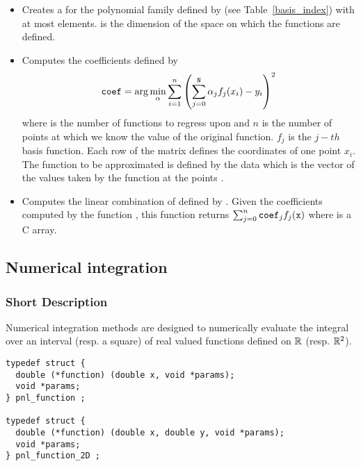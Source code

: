 \begin{itemize}
\item {}
  \sshortdescribe Creates a  for the polynomial family
  defined by  (see Table~\ref{basis_index}) with at most 
  elements.  is the dimension of the space on which the functions are
  defined.

\item {}
  \sshortdescribe Computes the coefficients  defined by
  \begin{equation*}
    {\tt coef} = \arg\min_\alpha \sum_{i=1}^n
    \left( \sum_{j=0}^{{\tt N}} \alpha_j  f_j(x_i) - y_i\right)^2
  \end{equation*}
  where  is the number of functions to regress upon and $n$ is the
  number of points at which we know the value of the original function. $f_j$
  is the $j-th$ basis function. Each row of the matrix  defines the
  coordinates of one point $x_i$. The function to be approximated is defined
  by the data  which is the vector of the values taken by the function
  at the points .
  
\item {}
  \sshortdescribe Computes the linear combination of  defined by
  . Given the coefficients computed by the function
  , this function returns $\sum_{j=0}^n
  {\tt coef}_j  f_j({\tt x})$ where  is a C array.
\end{itemize}

\subsection{Numerical integration}
\subsubsection{Short Description}

Numerical integration methods are designed to numerically evaluate the
integral over an interval (resp. a square) of real valued functions defined on
${\mathbb R}$ (resp. ${\mathbb R}^2$).

\begin{verbatim}
typedef struct {
  double (*function) (double x, void *params);
  void *params;
} pnl_function ;

typedef struct {
  double (*function) (double x, double y, void *params);
  void *params;
} pnl_function_2D ;
\end{verbatim}

